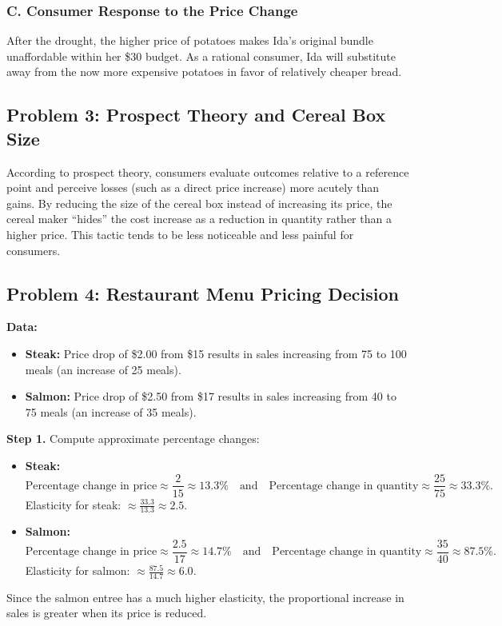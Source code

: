 \documentclass[12pt]{article}
\begin{document}
\subsubsection*{C. Consumer Response to the Price Change}
After the drought, the higher price of potatoes makes Ida’s original bundle unaffordable within her \$30 budget. As a rational consumer, Ida will substitute away from the now more expensive potatoes in favor of relatively cheaper bread.

\subsection*{Problem 3: Prospect Theory and Cereal Box Size}
According to prospect theory, consumers evaluate outcomes relative to a reference point and perceive losses (such as a direct price increase) more acutely than gains. By reducing the size of the cereal box instead of increasing its price, the cereal maker ``hides'' the cost increase as a reduction in quantity rather than a higher price. This tactic tends to be less noticeable and less painful for consumers.

\subsection*{Problem 4: Restaurant Menu Pricing Decision}
\textbf{Data:}
\begin{itemize}[noitemsep]
    \item \textbf{Steak:} Price drop of \$2.00 from \$15 results in sales increasing from 75 to 100 meals (an increase of 25 meals).
    \item \textbf{Salmon:} Price drop of \$2.50 from \$17 results in sales increasing from 40 to 75 meals (an increase of 35 meals).
\end{itemize}

\textbf{Step 1.} Compute approximate percentage changes:
\begin{itemize}[noitemsep]
    \item \textbf{Steak:}
          \[
              \text{Percentage change in price} \approx \frac{2}{15} \approx 13.3\% \quad \text{and} \quad \text{Percentage change in quantity} \approx \frac{25}{75} \approx 33.3\%.
          \]
          Elasticity for steak: \(\approx \frac{33.3}{13.3} \approx 2.5\).

    \item \textbf{Salmon:}
          \[
              \text{Percentage change in price} \approx \frac{2.5}{17} \approx 14.7\% \quad \text{and} \quad \text{Percentage change in quantity} \approx \frac{35}{40} \approx 87.5\%.
          \]
          Elasticity for salmon: \(\approx \frac{87.5}{14.7} \approx 6.0\).
\end{itemize}
Since the salmon entree has a much higher elasticity, the proportional increase in sales is greater when its price is reduced.
\end{document}
